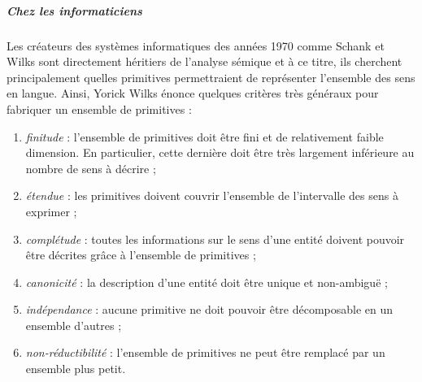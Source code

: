 {\subparagraph{Chez les informaticiens}

Les créateurs des systèmes informatiques des années 1970 comme Schank
\cite{schank1972} et Wilks sont directement héritiers de l'analyse
sémique et à ce titre, ils cherchent principalement quelles primitives
permettraient de représenter l'ensemble des sens en langue. Ainsi,
Yorick Wilks énonce quelques critères très généraux pour fabriquer un
ensemble de primitives \cite{Wilks1977} :

\begin{enumerate}
  
\item \emph{finitude} : l'ensemble de primitives doit être fini et de
  relativement faible dimension. En particulier, cette dernière doit
  être très largement inférieure au nombre de sens à décrire ;
  
\item \emph{étendue} : les primitives doivent couvrir l'ensemble de
  l'intervalle des sens à exprimer ;
  
\item \emph{complétude} : toutes les informations sur le sens d'une
  entité doivent pouvoir être décrites grâce à l'ensemble de
  primitives ;
  
\item \emph{canonicité} : la description d'une entité doit être unique
  et non-ambiguë ;
  
\item \emph{indépendance} : aucune primitive ne doit pouvoir être
  décomposable en un ensemble d'autres ;
  
\item \emph{non-réductibilité} : l'ensemble de primitives ne peut être
  remplacé par un ensemble plus petit.

\end{enumerate}


}
